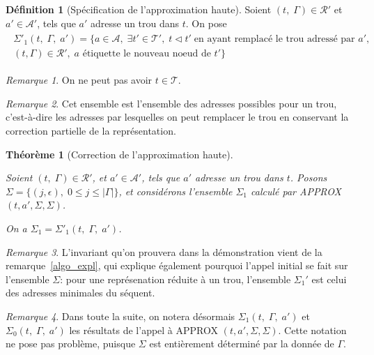 \documentclass[11pt,a4paper]{article}
\theoremstyle{plain}
\newtheorem{theorem}{Théorème}
\theoremstyle{definition}
\newtheorem{definition}{Définition}
\theoremstyle{remark}
\newtheorem{remark}{Remarque}
\newcommand*{\sequent}{\Gamma}
\newcommand*{\addresses}{\ensuremath{\mathcal{A}}}
\newcommand*{\treeaddresses}{\ensuremath{\mathcal{A'}}}
\newcommand*{\trees}{\ensuremath{\mathcal{T}}}
\newcommand*{\treespartial}{\ensuremath{\mathcal{T'}}}
\newcommand*{\representationspartial}{\ensuremath{\mathcal{R'}}}
\newcommand*{\relapprox}{\ensuremath{\triangleleft}}
\newcommand*{\lowapprox}{\ensuremath{\Sigma_0}}
\newcommand*{\highapprox}{\ensuremath{\Sigma_1}}
\newcommand*{\highapproxspec}{\ensuremath{\Sigma'_1}}
\begin{document}
\begin{definition}[Spécification de l'approximation haute]
    Soient $(t, \; \sequent) \in \representationspartial$ et $a' \in \treeaddresses$, tels que $a'$ adresse un trou dans $t$. On pose
    \begin{align*}
        \begin{multlined}
            \highapproxspec \left( t, \; \sequent, \; a' \right) = \{ a \in \addresses, \; \exists t' \in \treespartial, \; t \relapprox t' \; \text{en ayant remplacé le trou adressé par $a'$}, \\
            (t, \sequent) \in \representationspartial, \; \text{$a$ étiquette le nouveau noeud de $t'$} \}
        \end{multlined}
    \end{align*}

    \begin{remark}
         On ne peut pas avoir $t \in \trees$.
    \end{remark}

    \begin{remark}
         Cet ensemble est l'ensemble des adresses possibles pour un trou, c'est-à-dire les adresses par lesquelles on peut remplacer le trou en conservant la correction partielle de la représentation.
    \end{remark}
\end{definition}

\begin{theorem}[Correction de l'approximation haute]
    \label{highapprox_correction}
    
    Soient $(t, \; \sequent) \in \representationspartial$, et $a' \in \treeaddresses$, tels que $a'$ adresse un trou dans $t$. Posons $\Sigma = \{ (j, \epsilon), \; 0 \leq j \leq |\sequent| \}$, et considérons l'ensemble $\highapprox$ calculé par APPROX$(t, a', \Sigma, \Sigma)$.
    
    On a $\highapprox = \highapproxspec \left( t, \; \sequent, \; a' \right)$.
\end{theorem}

\begin{remark}
    L'invariant qu'on prouvera dans la démonstration vient de la remarque~\ref{algo_expl}, qui explique également pourquoi l'appel initial se fait sur l'ensemble $\Sigma$: pour une représenation réduite à un trou, l'ensemble $\highapprox'$ est celui des adresses minimales du séquent.
\end{remark}

\begin{remark}
    Dans toute la suite, on notera désormais $\highapprox \left( t, \; \sequent, \; a' \right)$ et $\lowapprox \left( t, \; \sequent, \; a' \right)$ les résultats de l'appel à APPROX $(t, a', \Sigma, \Sigma)$. Cette notation ne pose pas problème, puisque $\Sigma$ est entièrement déterminé par la donnée de $\sequent$.
\end{remark}
\end{document}
